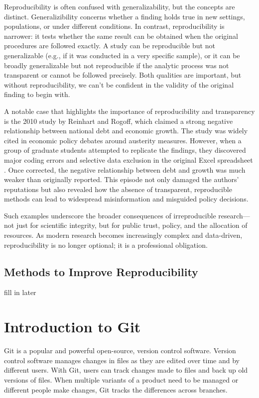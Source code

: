 Reproducibility is often confused with generalizability, but the concepts are distinct. Generalizibility concerns whether a finding holds true in new settings, populations, or under different conditions. In contrast, reproducibility is narrower: it tests whether the same result can be obtained when the original procedures are followed exactly. A study can be reproducible but not generalizable (e.g., if it was conducted in a very specific sample), or it can be broadly generalizable but not reproducible if the analytic process was not transparent or cannot be followed precisely. Both qualities are important, but without reproducibility, we can’t be confident in the validity of the original finding to begin with.

A notable case that highlights the importance of reproducibility and transparency is the 2010 study by Reinhart and Rogoff, which claimed a strong negative relationship between national debt and economic growth. The study was widely cited in economic policy debates around austerity measures. However, when a group of graduate students attempted to replicate the findings, they discovered major coding errors and selective data exclusion in the original Excel spreadsheet \cite{cassidy2013reinhart}. Once corrected, the negative relationship between debt and growth was much weaker than originally reported. This episode not only damaged the authors’ reputations but also revealed how the absence of transparent, reproducible methods can lead to widespread misinformation and misguided policy decisions.

Such examples underscore the broader consequences of irreproducible research—not just for scientific integrity, but for public trust, policy, and the allocation of resources. As modern research becomes increasingly complex and data-driven, reproducibility is no longer optional; it is a professional obligation.

\subsection*{Methods to Improve Reproducibility}
fill in later

\section{Introduction to Git}
Git is a popular and powerful open-source, version control software.  Version control software manages changes in files as they are edited over time and by different users.  With Git, users can track changes made to files and back up old versions of files. When multiple variants of a product need to be managed or different people make changes, Git tracks the differences across branches.

